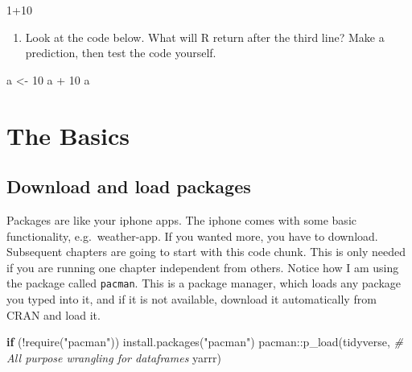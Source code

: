 \documentclass[
]{book}
\newenvironment{Shaded}{\begin{snugshade}}{\end{snugshade}}
\newcommand{\CommentTok}[1]{\textcolor[rgb]{0.56,0.35,0.01}{\textit{#1}}}
\newcommand{\ControlFlowTok}[1]{\textcolor[rgb]{0.13,0.29,0.53}{\textbf{#1}}}
\newcommand{\DecValTok}[1]{\textcolor[rgb]{0.00,0.00,0.81}{#1}}
\newcommand{\FunctionTok}[1]{\textcolor[rgb]{0.00,0.00,0.00}{#1}}
\newcommand{\NormalTok}[1]{#1}
\newcommand{\OtherTok}[1]{\textcolor[rgb]{0.56,0.35,0.01}{#1}}
\newcommand{\SpecialCharTok}[1]{\textcolor[rgb]{0.00,0.00,0.00}{#1}}
\newcommand{\StringTok}[1]{\textcolor[rgb]{0.31,0.60,0.02}{#1}}
\providecommand{\tightlist}{%
  \setlength{\itemsep}{0pt}\setlength{\parskip}{0pt}}
\begin{document}
\begin{Shaded}
\begin{Highlighting}[]
\DecValTok{1}\SpecialCharTok{+}\DecValTok{10}
\end{Highlighting}
\end{Shaded}

\begin{enumerate}
\def\labelenumi{\arabic{enumi}.}
\setcounter{enumi}{2}
\tightlist
\item
  Look at the code below. What will R return after the third line? Make a prediction, then test the code yourself.
\end{enumerate}

\begin{Shaded}
\begin{Highlighting}[]
\NormalTok{a }\OtherTok{\textless{}{-}} \DecValTok{10}
\NormalTok{a }\SpecialCharTok{+} \DecValTok{10}
\NormalTok{a}
\end{Highlighting}
\end{Shaded}

\hypertarget{basics}{%
\chapter{The Basics}\label{basics}}

\hypertarget{download-and-load-packages}{%
\section*{Download and load packages}\label{download-and-load-packages}}

Packages are like your iphone apps. The iphone comes with some basic functionality, e.g.~weather-app. If you wanted more, you have to download. Subsequent chapters are going to start with this code chunk. This is only needed if you are running one chapter independent from others. Notice how I am using the package called \texttt{pacman}. This is a package manager, which loads any package you typed into it, and if it is not available, download it automatically from CRAN and load it.

\begin{Shaded}
\begin{Highlighting}[]
\ControlFlowTok{if}\NormalTok{ (}\SpecialCharTok{!}\FunctionTok{require}\NormalTok{(}\StringTok{"pacman"}\NormalTok{)) }\FunctionTok{install.packages}\NormalTok{(}\StringTok{"pacman"}\NormalTok{)}
\NormalTok{pacman}\SpecialCharTok{::}\FunctionTok{p\_load}\NormalTok{(tidyverse, }\CommentTok{\# All purpose wrangling for dataframes}
\NormalTok{               yarrr) }
\end{Highlighting}
\end{Shaded}
\end{document}

